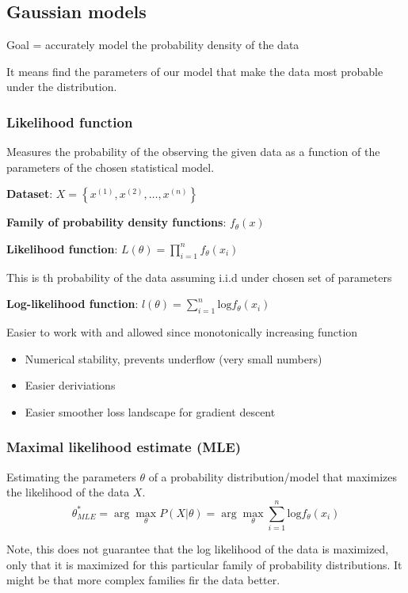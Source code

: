\subsection{Gaussian models}

Goal = accurately model the probability density of the data

It means find the parameters of our model that make the data most probable under the distribution.

\subsubsection*{Likelihood function}
Measures the probability of the observing the given data as a function of the parameters of the chosen statistical model.

\textbf{Dataset}: \(X = \left\{x^{(1)},x^{(2)},\dots,x^{(n)}\right\}\)

\textbf{Family of probability density functions}: \(f_\theta(x)\)

\textbf{Likelihood function}: \(L(\theta) = \prod_{i = 1}^{n}f_\theta(x_i)\)

This is th probability of the data assuming i.i.d under chosen set of parameters

\textbf{Log-likelihood function}: \(l(\theta) = \sum_{i = 1}^{n} \text{log}f_\theta(x_i)\)

Easier to work with and allowed since monotonically increasing function
\begin{itemize}
    \item Numerical stability, prevents underflow (very small numbers)
    \item Easier deriviations
    \item Easier smoother loss landscape for gradient descent
\end{itemize}

\subsubsection*{Maximal likelihood estimate (MLE)}
Estimating the parameters \(\theta\) of a probability distribution/model that maximizes the likelihood of the data \(X\).
\[
\theta_{MLE}^* = \arg\max_{\theta} P(X|\theta) =  \arg\max_{\theta} \sum_{i = 1}^{n} \text{log} f_\theta(x_i)
\]

Note, this does not guarantee that the log likelihood of the data is maximized, only that it is maximized for this particular family of probability distributions. 
It might be that more complex families fir the data better. 


